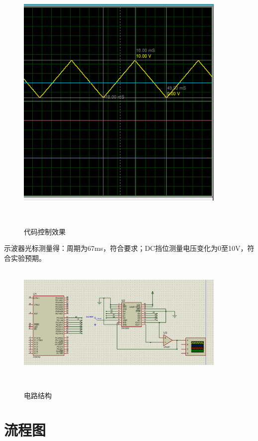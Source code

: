 \documentclass[12pt,hyperref,a4paper,UTF8]{ctexart}
\begin{document}
\begin{figure}[H] %
    \centering
    \includegraphics[width=0.9\textwidth]{figures/201.png} %
    \caption{代码控制效果} %
    \label{fig:example} %
\end{figure}
示波器光标测量得：周期为67ms，符合要求；DC挡位测量电压变化为0至10V，符合实验预期。
\begin{figure}[H] %
    \centering
    \includegraphics[width=0.9\textwidth]{figures/202.png} %
    \caption{电路结构} %
    \label{fig:example} %
\end{figure}

\section{流程图}
\end{document}
